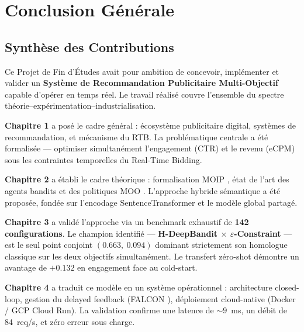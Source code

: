 
\chapter*{Conclusion Générale}

\section*{Synthèse des Contributions}

Ce Projet de Fin d'Études avait pour ambition de concevoir, implémenter et valider un \textbf{Système de Recommandation Publicitaire Multi-Objectif} capable d'opérer en temps réel. Le travail réalisé couvre l'ensemble du spectre théorie--expérimentation--industrialisation.

\textbf{Chapitre 1} a posé le cadre général : écosystème publicitaire digital, systèmes de recommandation, et mécanisme du RTB. La problématique centrale a été formalisée --- optimiser simultanément l'engagement (CTR) et le revenu (eCPM) sous les contraintes temporelles du Real-Time Bidding.

\textbf{Chapitre 2} a établi le cadre théorique : formalisation MOIP \parencite{deb2001multi}, état de l'art des agents bandits \parencite{li2010contextual, riquelme2018deep} et des politiques MOO \parencite{deb2002fast,ehrgott2005multicriteria}. L'approche hybride sémantique a été proposée, fondée sur l'encodage SentenceTransformer \parencite{reimers2019sentence} et le modèle global partagé.

\textbf{Chapitre 3} a validé l'approche via un benchmark exhaustif de \textbf{142 configurations}. Le champion identifié --- \textbf{H-DeepBandit $\times$ $\varepsilon$-Constraint} --- est le seul point conjoint $(0.663,\ 0.094)$ dominant strictement son homologue classique sur les deux objectifs simultanément. Le transfert zéro-shot démontre un avantage de $+0.132$ en engagement face au cold-start.

\textbf{Chapitre 4} a traduit ce modèle en un système opérationnel : architecture closed-loop, gestion du delayed feedback (FALCON \parencite{ktena2019addressing}), déploiement cloud-native (Docker / GCP Cloud Run). La validation confirme une latence de $\sim 9$~ms, un débit de 84~req/s, et zéro erreur sous charge.


